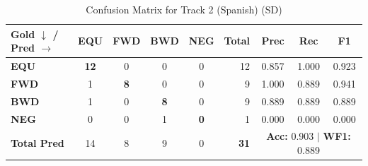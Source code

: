 \begin{table}[ht]
\centering
\small
\begin{tabular}{l|cccc|r|ccc}
\toprule
\textbf{Gold $\downarrow$ / Pred $\rightarrow$} & \textbf{EQU} & \textbf{FWD} & \textbf{BWD} & \textbf{NEG} & \textbf{Total} & \textbf{Prec} & \textbf{Rec} & \textbf{F1} \\
\midrule
\textbf{EQU} & \textbf{12} & 0 & 0 & 0 & 12 & 0.857 & 1.000 & 0.923 \\
\textbf{FWD} & 1 & \textbf{8} & 0 & 0 & 9 & 1.000 & 0.889 & 0.941 \\
\textbf{BWD} & 1 & 0 & \textbf{8} & 0 & 9 & 0.889 & 0.889 & 0.889 \\
\textbf{NEG} & 0 & 0 & 1 & \textbf{0} & 1 & 0.000 & 0.000 & 0.000 \\
\midrule
\textbf{Total Pred} & 14 & 8 & 9 & 0 & \textbf{31} & \multicolumn{3}{c}{\textbf{Acc:} 0.903 $\mid$ \textbf{WF1:} 0.889} \\
\bottomrule
\end{tabular}
\caption{Confusion Matrix for Track 2 (Spanish) (SD)}
\label{tab:confusion_matrix}
\end{table}